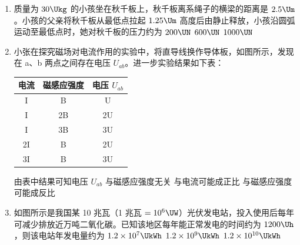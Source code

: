\documentclass[\gkver]{gaokaozhenti}
\begin{document}
\begin{enumerate}
\item
质量为 $30\Ukg$ 的小孩坐在秋千板上，秋千板离系绳子的横梁的距离是 $2.5\Um$。小孩的父亲将秋千板从最低点拉起 $1.25\Um$ 高度后由静止释放，小孩沿圆弧运动至最低点时，她对秋千板的压力约为
{$200\UN$}
{$600\UN$}
{$1000\UN$}

\item
小张在探究磁场对电流作用的实验中，将直导线换作导体板，如图所示，发现在 a、b 两点之间存在电压 $U_{ab}$。进一步实验结果如下表：

\begin{center}
\begin{tabular}{|c|c|c|}
\hline
电流 & 磁感应强度 & 电压 $U_{ab}$ \\ \hline
I & B & U \\ \hline
I & 2B & 2U \\ \hline
I & 3B & 3U \\ \hline
2I & B & 2U \\ \hline
3I & B & 3U \\ \hline
\end{tabular}
\end{center}

由表中结果可知电压 $U_{ab}$
{与磁感应强度无关}
{与电流可能成正比}
{与磁感应强度可能成反比}

\item
如图所示是我国某 10 兆瓦（1 兆瓦 $=10^{6}\UW$）光伏发电站，投入使用后每年可减少排放近万吨二氧化碳。已知该地区每年能正常发电的时间约为 $1200\Uh$，则该电站年发电量约为
{$1.2\times10^{7}\UkWh$}
{$1.2\times10^{9}\UkWh$}
{$1.2\times10^{10}\UkWh$}


\end{enumerate}
\end{document}
